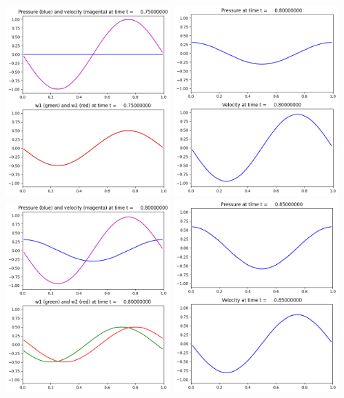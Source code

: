 \documentclass[11pt]{article}
\begin{document}
\includegraphics[width=0.475\textwidth]{frame0015fig2.png}
\vskip 10pt 
\includegraphics[width=0.475\textwidth]{frame0016fig1.png}
\includegraphics[width=0.475\textwidth]{frame0016fig2.png}
\vskip 10pt 
\includegraphics[width=0.475\textwidth]{frame0017fig1.png}
\end{document}
